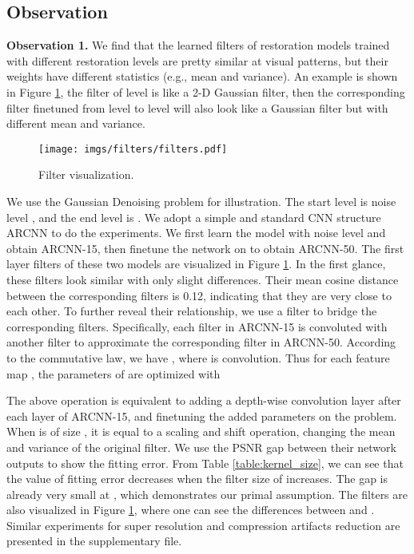 \documentclass[10pt,twocolumn,letterpaper]{article}
\begin{document}
\subsection{Observation}

\textbf{Observation 1.} We find that the learned filters of restoration models trained with different restoration levels are pretty similar at visual patterns, but their weights have different statistics (e.g., mean and variance). An example is shown in Figure \ref{filters_noise}, the filter  of level  is like a 2-D Gaussian filter, then the corresponding filter  finetuned from level  to level  will also look like a Gaussian filter but with different mean and variance. 
\begin{figure}[t]
\centering
\texttt{[image: imgs/filters/filters.pdf]}
\vspace{-0.5em}
\caption{Filter visualization.}
\vspace{-1.5em}
\label{filters_noise}
\end{figure}
We use the Gaussian Denoising problem for illustration. The start level is noise level , and the end level is . We adopt a simple and standard CNN structure ARCNN \cite{Dong_2015_ICCV} to do the experiments. We first learn the model with noise level  and obtain ARCNN-15, then finetune the network on  to obtain ARCNN-50. The first layer filters of these two models are visualized in Figure \ref{filters_noise}. In the first glance, these filters look similar with only slight differences. Their mean cosine distance between the corresponding filters is 0.12, indicating that they are very close to each other.
To further reveal their relationship, we use a filter to bridge the corresponding filters. Specifically, each filter  in ARCNN-15 is convoluted with another filter  to approximate the corresponding filter  in ARCNN-50. According to the commutative law, we have , where  is convolution. Thus for each feature map , the parameters of  are optimized with 

\vspace{-1em}

\vspace{-1em}

The above operation is equivalent to adding a depth-wise convolution layer after each layer of ARCNN-15, and finetuning the added parameters on the   problem. When  is of size , it is equal to a scaling and shift operation, changing the mean and variance of the original filter. We use the PSNR gap between their network outputs to show the fitting error. From Table \ref{table:kernel_size}, we can see that the value of fitting error decreases when the filter size of  increases. The gap is already very small at , which demonstrates our primal assumption. The  filters are also visualized in Figure \ref{filters_noise}, where one can see the differences between  and . Similar experiments for super resolution and compression artifacts reduction are presented in the supplementary file. 
\end{document}
